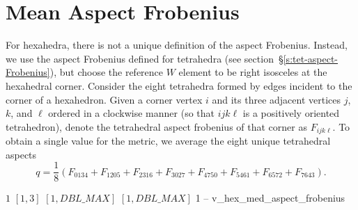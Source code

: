 \section{Mean Aspect Frobenius\label{s:hex-med-aspect-frobenius}}

For hexahedra, there is not a unique definition of the aspect Frobenius.
Instead, we use the aspect Frobenius
defined for tetrahedra (see section~\S\ref{s:tet-aspect-Frobenius}),
but choose the reference $W$ element to be right isosceles at
the hexahedral corner. Consider the eight tetrahedra formed by edges
incident to the corner of a hexahedron. 
Given a corner vertex $i$ and its three adjacent vertices $j$, $k$, and $\ell$ ordered
in a clockwise manner (so that $ijk\ell$ is a positively oriented tetrahedron),
denote the tetrahedral aspect frobenius of that corner as $F_{ijk\ell}$.
To obtain a single value for the metric, we average the eight unique tetrahedral aspects
\[
  q = \frac{1}{8}\left(F_{0134} + F_{1205} + F_{2316} + F_{3027} + F_{4750} + F_{5461} + F_{6572} + F_{7643} \right).
\]

%
{$1$}%
{$[1,3]$}%
{$[1,DBL\_MAX]$}%
{$[1,DBL\_MAX]$}%
{1}%
{--}%
{v\_hex\_med\_aspect\_frobenius}%
